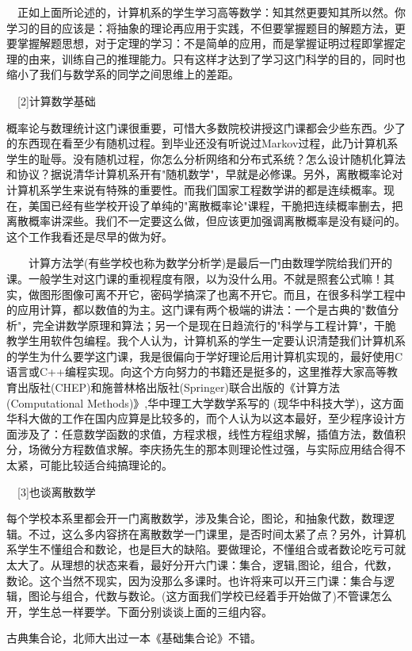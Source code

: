 　正如上面所论述的，计算机系的学生学习高等数学：知其然更要知其所以然。你学习的目的应该是：将抽象的理论再应用于实践，不但要掌握题目的解题方法，更要掌握解题思想，对于定理的学习：不是简单的应用，而是掌握证明过程即掌握定理的由来，训练自己的推理能力。只有这样才达到了学习这门科学的目的，同时也缩小了我们与数学系的同学之间思维上的差距。 

　[2]计算数学基础 

概率论与数理统计这门课很重要，可惜大多数院校讲授这门课都会少些东西。少了的东西现在看至少有随机过程。到毕业还没有听说过Markov过程，此乃计算机系学生的耻辱。没有随机过程，你怎么分析网络和分布式系统？怎么设计随机化算法和协议？据说清华计算机系开有"随机数学"，早就是必修课。另外，离散概率论对计算机系学生来说有特殊的重要性。而我们国家工程数学讲的都是连续概率。现在，美国已经有些学校开设了单纯的"离散概率论"课程，干脆把连续概率删去，把离散概率讲深些。我们不一定要这么做，但应该更加强调离散概率是没有疑问的。这个工作我看还是尽早的做为好。 

　　计算方法学(有些学校也称为数学分析学)是最后一门由数理学院给我们开的课。一般学生对这门课的重视程度有限，以为没什么用。不就是照套公式嘛！其实，做图形图像可离不开它，密码学搞深了也离不开它。而且，在很多科学工程中的应用计算，都以数值的为主。这门课有两个极端的讲法：一个是古典的"数值分析"，完全讲数学原理和算法；另一个是现在日趋流行的"科学与工程计算"，干脆教学生用软件包编程。我个人认为，计算机系的学生一定要认识清楚我们计算机系的学生为什么要学这门课，我是很偏向于学好理论后用计算机实现的，最好使用C语言或C++编程实现。向这个方向努力的书籍还是挺多的，这里推荐大家高等教育出版社(CHEP)和施普林格出版社(Springer)联合出版的《计算方法(Computational Methods)》,华中理工大学数学系写的 (现华中科技大学)，这方面华科大做的工作在国内应算是比较多的，而个人认为以这本最好，至少程序设计方面涉及了：任意数学函数的求值，方程求根，线性方程组求解，插值方法，数值积分，场微分方程数值求解。李庆扬先生的那本则理论性过强，与实际应用结合得不太紧，可能比较适合纯搞理论的。 

　[3]也谈离散数学　　 

每个学校本系里都会开一门离散数学，涉及集合论，图论，和抽象代数，数理逻辑。不过，这么多内容挤在离散数学一门课里，是否时间太紧了点？另外，计算机系学生不懂组合和数论，也是巨大的缺陷。要做理论，不懂组合或者数论吃亏可就太大了。从理想的状态来看，最好分开六门课：集合，逻辑,图论，组合，代数，数论。这个当然不现实，因为没那么多课时。也许将来可以开三门课：集合与逻辑，图论与组合，代数与数论。(这方面我们学校已经着手开始做了)不管课怎么开，学生总一样要学。下面分别谈谈上面的三组内容。 

古典集合论，北师大出过一本《基础集合论》不错。 

